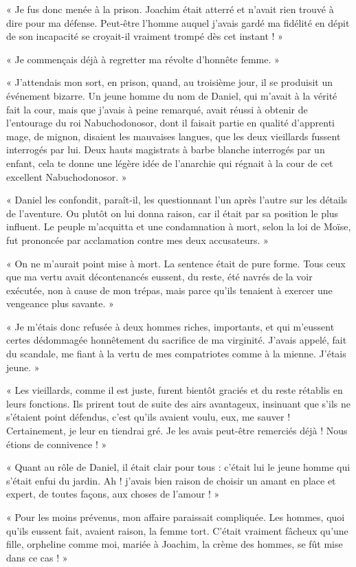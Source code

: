 \documentclass[a4paper, 11pt, oneside, polutonikogreek, french]{article}
\begin{document}
« Je fus donc menée à la prison. Joachim était atterré et n'avait rien trouvé à dire pour ma défense. Peut-être l'homme auquel j'avais gardé ma fidélité en dépit de son incapacité se croyait-il vraiment trompé dès cet instant ! »

« Je commençais déjà à regretter ma révolte d'honnête femme. »

« J'attendais mon sort, en prison, quand, au troisième jour, il se produisit un événement bizarre. Un jeune homme du nom de Daniel, qui m'avait à la vérité fait la cour, mais que j'avais à peine remarqué, avait réussi à obtenir de l'entourage du roi Nabuchodonosor, dont il faisait partie en qualité d'apprenti mage, de mignon, disaient les mauvaises langues, que les deux vieillards fussent interrogés par lui. Deux hauts magistrats à barbe blanche interrogés par un enfant, cela te donne une légère idée de l'anarchie qui régnait à la cour de cet excellent Nabuchodonosor. »

« Daniel les confondit, paraît-il, les questionnant l'un après l'autre sur les détails de l'aventure. Ou plutôt on lui donna raison, car il était par sa position le plus influent. Le peuple m'acquitta et une condamnation à mort, selon la loi de Moïse, fut prononcée par acclamation contre mes deux accusateurs. »

« On ne m'aurait point mise à mort. La sentence était de pure forme. Tous ceux que ma vertu avait décontenancés eussent, du reste, été navrés de la voir exécutée, non à cause de mon trépas, mais parce qu'ils tenaient à exercer une vengeance plus savante. »

« Je m'étais donc refusée à deux hommes riches, importants, et qui m'eussent certes dédommagée honnêtement du sacrifice de ma virginité. J'avais appelé, fait du scandale, me fiant à la vertu de mes compatriotes comme à la mienne. J'étais jeune. »

« Les vieillards, comme il est juste, furent bientôt graciés et du reste rétablis en leurs fonctions. Ils prirent tout de suite des airs avantageux, insinuant que s'ils ne s'étaient point défendus, c'est qu'ils avaient voulu, eux, me sauver ! Certainement, je leur en tiendrai gré. Je les avais peut-être remerciés déjà ! Nous étions de connivence ! »

« Quant au rôle de Daniel, il était clair pour tous : c'était lui le jeune homme qui s'était enfui du jardin. Ah ! j'avais bien raison de choisir un amant en place et expert, de toutes façons, aux choses de l'amour ! »

« Pour les moins prévenus, mon affaire paraissait compliquée. Les hommes, quoi qu'ils eussent fait, avaient raison, la femme tort. C'était vraiment fâcheux qu'une fille, orpheline comme moi, mariée à Joachim, la crème des hommes, se fût mise dans ce cas ! »
\end{document}

